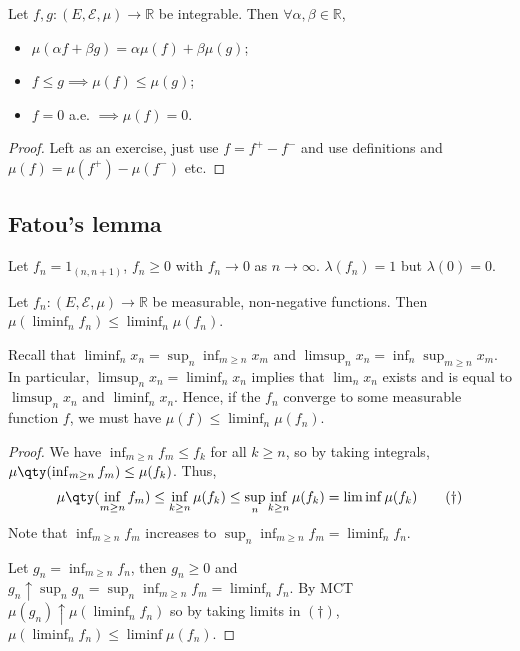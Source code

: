 \begin{theorem}
	Let $f, g \colon (E, \mathcal E, \mu) \to \mathbb R$ be integrable.
	Then $\forall \alpha, \beta \in \mathbb{R}$,
	\begin{itemize}
		\item $\mu(\alpha f + \beta g) = \alpha \mu(f) + \beta \mu(g)$;
		\item $f \leq g \implies \mu(f) \leq \mu(g)$;
		\item $f = 0$ a.e. $\implies \mu(f) = 0$.
	\end{itemize}
\end{theorem}

\begin{proof}
	Left as an exercise, just use $f = f^+ - f^-$ and use definitions and $\mu(f) = \mu(f^+) - \mu(f^-)$ etc.
\end{proof}

\subsection{Fatou's lemma}
\begin{example}
	Let $f_n = 1_{(n, n+1)}$, $f_n \geq 0$ with $f_n \to 0$ as $n \to \infty$.
	$\lambda(f_n) = 1$ but $\lambda(0) = 0$.
\end{example}

\begin{lemma}
	Let $f_n \colon (E, \mathcal E, \mu) \to \mathbb R$ be measurable, non-negative functions.
	Then $\mu (\liminf_n f_n) \leq \liminf_n \mu(f_n)$.
\end{lemma}

\begin{remark}
	Recall that $\liminf_n x_n = \sup_n \inf_{m \geq n} x_m$ and $\limsup_n x_n = \inf_n \sup_{m \geq n} x_m$.
	In particular, $\limsup_n x_n = \liminf_n x_n$ implies that $\lim_n x_n$ exists and is equal to $\limsup_n x_n$ and $\liminf_n x_n$.
	Hence, if the $f_n$ converge to some measurable function $f$, we must have $\mu(f) \leq \liminf_n \mu(f_n)$.
\end{remark}

\begin{proof}
	We have $\inf_{m \geq n} f_m \leq f_k$ for all $k \geq n$, so by taking integrals, $\mu\qty(\inf_{m \geq n} f_m) \leq \mu(f_k)$.
	Thus,
	\begin{align*}
		\mu\qty(\inf_{m \geq n} f_m) \leq \inf_{k \geq n} \mu(f_k) \leq \sup_n \inf_{k \geq n} \mu(f_k) = \liminf \mu(f_k) \tag{$\dagger$}
	\end{align*}
	Note that $\inf_{m \geq n} f_m$ increases to $\sup_n \inf_{m \geq n} f_m = \liminf_n f_n$.

	Let $g_n = \inf_{m \geq n} f_n$, then $g_n \geq 0$ and $g_n \uparrow \sup_n g_n = \sup_n \inf_{m \geq n} f_m = \liminf_n f_n$.
	By MCT $\mu(g_n) \uparrow \mu(\liminf_n f_n)$ so by taking limits in $(\dagger)$, $\mu(\liminf_n f_n) \leq \liminf \mu(f_n)$.
\end{proof}

